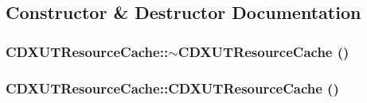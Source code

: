 \subsection{Constructor \& Destructor Documentation}
\hypertarget{class_c_d_x_u_t_resource_cache_a1986d13c2bac18a41178e446917e1d64}{
\subsubsection[{$\sim$CDXUTResourceCache}]{\setlength{\rightskip}{0pt plus 5cm}CDXUTResourceCache::$\sim$CDXUTResourceCache ()}}
\label{class_c_d_x_u_t_resource_cache_a1986d13c2bac18a41178e446917e1d64}
\hypertarget{class_c_d_x_u_t_resource_cache_a3bc1b064b7dd4522b89186491179e192}{
\subsubsection[{CDXUTResourceCache}]{\setlength{\rightskip}{0pt plus 5cm}CDXUTResourceCache::CDXUTResourceCache ()}}
\label{class_c_d_x_u_t_resource_cache_a3bc1b064b7dd4522b89186491179e192}


